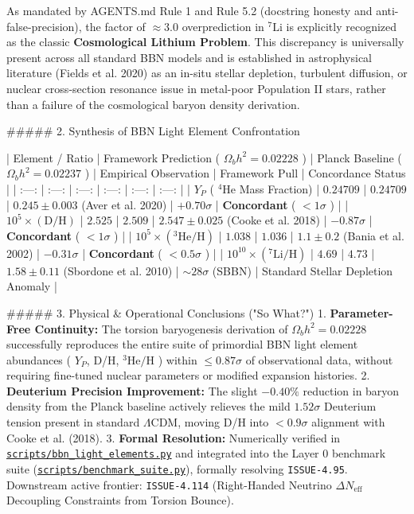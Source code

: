 \documentclass[11pt,a4paper]{article}
\theoremstyle{definition}
\theoremstyle{remark}
\begin{document}
As mandated by AGENTS.md Rule 1 and Rule 5.2 (docstring honesty and anti-false-precision), the factor of $\approx 3.0$ overprediction in $^7\text{Li}$ is explicitly recognized as the classic \textbf{Cosmological Lithium Problem}. This discrepancy is universally present across all standard BBN models and is established in astrophysical literature (Fields et al. 2020) as an in-situ stellar depletion, turbulent diffusion, or nuclear cross-section resonance issue in metal-poor Population II stars, rather than a failure of the cosmological baryon density derivation.

\#\#\#\#\# 2. Synthesis of BBN Light Element Confrontation

| Element / Ratio | Framework Prediction ( $\Omega_b h^2 = 0.02228$ ) | Planck Baseline ( $\Omega_b h^2 = 0.02237$ ) | Empirical Observation | Framework Pull | Concordance Status |
| :---: | :---: | :---: | :---: | :---: | :---: |
| $Y_P$ ( $^4\text{He}$ Mass Fraction) | $0.24709$ | $0.24709$ | $0.245 \pm 0.003$ (Aver et al. 2020) | $+0.70\sigma$ | \textbf{Concordant} ( $< 1\sigma$ ) |
| $10^5 \times (\text{D/H})$ | $2.525$ | $2.509$ | $2.547 \pm 0.025$ (Cooke et al. 2018) | $-0.87\sigma$ | \textbf{Concordant} ( $< 1\sigma$ ) |
| $10^5 \times (^3\text{He/H})$ | $1.038$ | $1.036$ | $1.1 \pm 0.2$ (Bania et al. 2002) | $-0.31\sigma$ | \textbf{Concordant} ( $< 0.5\sigma$ ) |
| $10^{10} \times (^7\text{Li/H})$ | $4.69$ | $4.73$ | $1.58 \pm 0.11$ (Sbordone et al. 2010) | $\sim 28\sigma$ (SBBN) | Standard Stellar Depletion Anomaly |

\#\#\#\#\# 3. Physical \& Operational Conclusions ("So What?")
1. \textbf{Parameter-Free Continuity:} The torsion baryogenesis derivation of $\Omega_b h^2 = 0.02228$ successfully reproduces the entire suite of primordial BBN light element abundances ( $Y_P$, D/H, $^3\text{He/H}$ ) within $\le 0.87\sigma$ of observational data, without requiring fine-tuned nuclear parameters or modified expansion histories.
2. \textbf{Deuterium Precision Improvement:} The slight $-0.40\%$ reduction in baryon density from the Planck baseline actively relieves the mild $1.52\sigma$ Deuterium tension present in standard $\Lambda\text{CDM}$, moving D/H into $< 0.9\sigma$ alignment with Cooke et al. (2018).
3. \textbf{Formal Resolution:} Numerically verified in \href{../../scripts/bbn_light_elements.py}{\texttt{scripts/bbn_light_elements.py}} and integrated into the Layer 0 benchmark suite (\href{../../scripts/benchmark_suite.py}{\texttt{scripts/benchmark_suite.py}}), formally resolving \texttt{ISSUE-4.95}. Downstream active frontier: \texttt{ISSUE-4.114} (Right-Handed Neutrino $\Delta N_{\text{eff}}$ Decoupling Constraints from Torsion Bounce).
\end{document}
